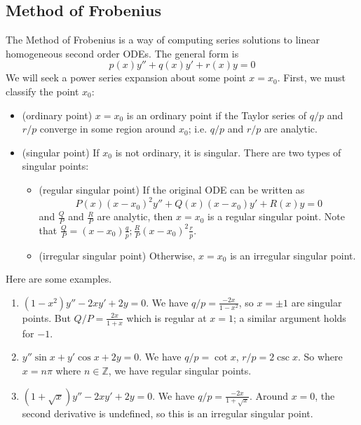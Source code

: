 \subsection{Method of Frobenius}
The Method of Frobenius is a way of computing series solutions to linear homogeneous second order ODEs. The general form is
\[ p(x)y'' + q(x)y' + r(x)y = 0 \]
We will seek a power series expansion about some point $x = x_0$. First, we must classify the point $x_0$:
\begin{itemize}
	\item (ordinary point) $x=x_0$ is an ordinary point if the Taylor series of $q/p$ and $r/p$ converge in some region around $x_0$; i.e. $q/p$ and $r/p$ are analytic.
	\item (singular point) If $x_0$ is not ordinary, it is singular. There are two types of singular points:
	      \begin{itemize}
		      \item (regular singular point) If the original ODE can be written as
		            \[ P(x)(x-x_0)^2 y'' + Q(x)(x-x_0)y' + R(x)y = 0 \]
		            and $\frac{Q}{P}$ and $\frac{R}{P}$ are analytic, then $x=x_0$ is a regular singular point. Note that $\frac{Q}{P} = (x-x_0)\frac{q}{p}; \frac{R}{P}(x-x_0)^2\frac{r}{p}$.
		      \item (irregular singular point) Otherwise, $x=x_0$ is an irregular singular point.
	      \end{itemize}
\end{itemize}
Here are some examples.
\begin{enumerate}
	\item $(1-x^2)y'' - 2xy' + 2y = 0$. We have $q/p = \frac{-2x}{1-x^2}$, so $x = \pm 1$ are singular points. But $Q/P = \frac{2x}{1+x}$ which is regular at $x=1$; a similar argument holds for $-1$.
	\item $y''\sin x + y'\cos x + 2y = 0$. We have $q/p = \cot x$, $r/p = 2\csc x$. So where $x = n\pi$ where $n \in \mathbb Z$, we have regular singular points.
	\item $(1+\sqrt{x})y'' - 2xy' + 2y = 0$. We have $q/p = \frac{-2x}{1+\sqrt{x}}$. Around $x=0$, the second derivative is undefined, so this is an irregular singular point.
\end{enumerate}
